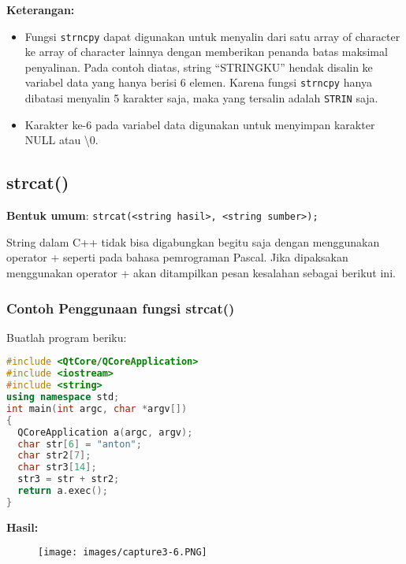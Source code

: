 \textbf{Keterangan:}

\begin{itemize}

\item
  Fungsi \texttt{strncpy} dapat digunakan untuk menyalin dari satu array
  of character ke array of character lainnya dengan memberikan penanda
  batas maksimal penyalinan. Pada contoh diatas, string ``STRINGKU''
  hendak disalin ke variabel data yang hanya berisi 6 elemen. Karena
  fungsi \texttt{strncpy} hanya dibatasi menyalin 5 karakter saja, maka
  yang tersalin adalah \texttt{STRIN} saja.
\item
  Karakter ke-6 pada variabel data digunakan untuk menyimpan karakter
 NULL atau \textbackslash0.
\end{itemize}

\subsection{strcat()}\label{strcat}

\textbf{Bentuk umum}:
\texttt{strcat(\textless{}string\ hasil\textgreater{},\ \textless{}string\ sumber\textgreater{});}

String dalam C++ tidak bisa digabungkan begitu saja dengan menggunakan
operator + seperti pada bahasa pemrograman Pascal. Jika dipaksakan
menggunakan operator + akan ditampilkan pesan kesalahan sebagai berikut
ini.

\subsubsection*{Contoh  Penggunaan fungsi strcat()}

Buatlah program beriku:

\begin{lstlisting}[language=c++, caption=Penggunaan fungsi strcat(), label=contoh3-22]
#include <QtCore/QCoreApplication>
#include <iostream>
#include <string>
using namespace std;
int main(int argc, char *argv[])
{
  QCoreApplication a(argc, argv);
  char str[6] = "anton";
  char str2[7];
  char str3[14];
  str3 = str + str2;
  return a.exec();
}
\end{lstlisting}

\textbf{Hasil:}

\begin{figure}[htbp]
\centering
\texttt{[image: images/capture3-6.PNG]}

\end{figure}

